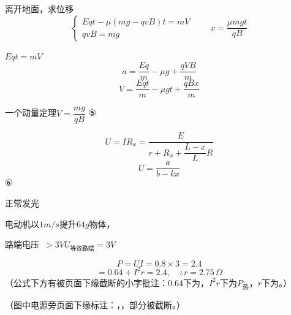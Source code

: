 离开地面，求位移
\[ \begin{cases} Eqt-\mu(mg-qvB)t=mV\\[2pt] qvB=mg \end{cases} \qquad x=\frac{\mu mgt}{qB} \]

$Eqt=mV$
\[ a=\frac{Eq}{m}-\mu g+\frac{qVB}{m} \]
\[ V=\frac{Eqt}{m}-\mu gt+\frac{qBx}{m} \]

一个动量定理\quad $V=\dfrac{mg}{qB}$
⑤

\[ U=IR_x=\frac{E}{r+R_x+\dfrac{L-x}{L}R} \]
\[ U=\frac{a}{b-kx} \]
⑥

正常发光

电动机以$1\unit{m/s}$提升$64\unit{g}$物体，

路端电压\ $>3\unit{V}$\quad $U_{\text{等效路端}}=3\unit{V}$

\[ P=UI=0.8\times3=2.4 \]
\[ =0.64+I^{2}r=2.4,\quad \therefore r=2.75\,\Omega \]
（公式下方有被页面下缘截断的小字批注：0.64下为，$I^2r$下为$P_{\text{热}}$，$r$下为。）

（图中电源旁页面下缘标注：，，部分被截断。）
